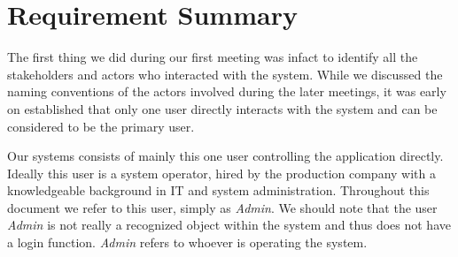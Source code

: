 \documentclass[12pt,a4paper,man]{report}
\begin{document}
\chapter{Requirement Summary}
\label{sec:orgcc0274b}
The first thing we did during our first meeting was infact to identify all the stakeholders and actors who interacted with the system. While we discussed the naming conventions of the actors involved during the later meetings, it was early on established that only one user directly interacts with the system and can be considered to be the primary user.

Our systems consists of mainly this one user controlling the application directly. Ideally this user is a system operator, hired by the production company with a knowledgeable background in IT and system administration. Throughout this document we refer to this user, simply as \emph{Admin}. We should note that the user \emph{Admin} is not really a recognized object within the system and thus does not have a login function. \emph{Admin} refers to whoever is operating the system.
\end{document}
